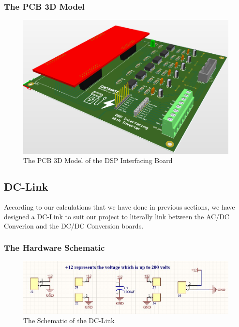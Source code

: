 \documentclass[12pt,a4paper]{book}
\begin{document}
\subsubsection{The PCB 3D Model}
\begin{figure}[h!]
  \centering
  \includegraphics[width = 15cm]{image43.png}
  \caption{The PCB 3D Model of the DSP Interfacing Board}
  \label{fig:image43}
\end{figure}

\subsection{DC-Link}
According to our calculations that we have done in previous sections, we have designed a DC-Link to suit our project to literally link between the AC/DC Converion and the DC/DC Conversion boards.

\subsubsection{The Hardware Schematic}
\begin{figure}[h!]
  \centering
  \includegraphics[width = 17cm]{image44.png}
  \caption{The Schematic of the DC-Link}
  \label{fig:image44}
\end{figure}
\end{document}
